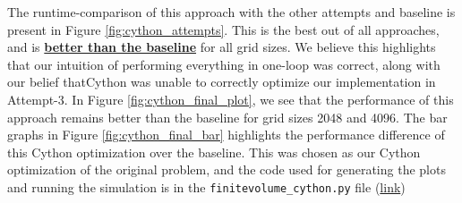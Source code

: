 \documentclass[a4paper,10pt]{article}
\begin{document}
The runtime-comparison of this approach with the other attempts and baseline is present in Figure \ref{fig:cython_attempts}.
This is the best out of all approaches, and is \underline{\textbf{better than the baseline}} for all grid sizes.
We believe this highlights that our intuition of performing everything in one-loop was correct, along with our belief thatCython was unable to correctly optimize our implementation in Attempt-3.
In Figure \ref{fig:cython_final_plot}, we see that the performance of this approach remains better than the baseline for grid sizes 2048 and 4096.
The bar graphs in Figure \ref{fig:cython_final_bar} highlights the performance difference of this Cython optimization over the baseline.
This was chosen as our Cython optimization of the original problem, and the code used for generating the plots and running the simulation is in the \verb|finitevolume_cython.py| file (\href{https://github.com/paulmyr/DD2358-HPC25/blob/master/10_project_rishi_paul/code/cython/finitevolume_cython.py}{link})
\end{document}
